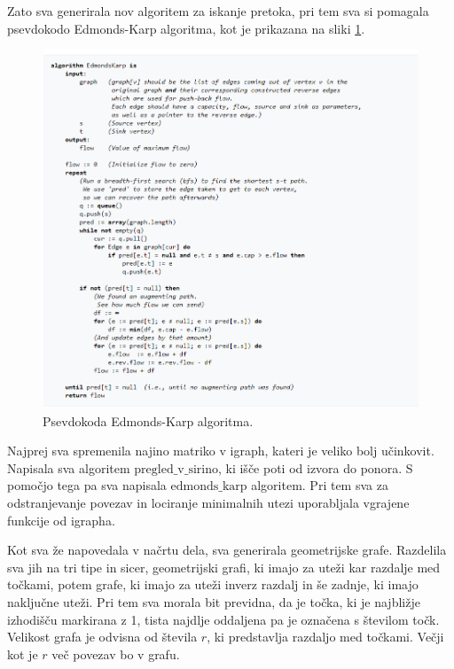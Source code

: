 \documentclass[a4paper]{article}
\begin{document}
Zato sva generirala nov algoritem za iskanje pretoka, pri tem sva si pomagala psevdokodo Edmonds-Karp algoritma, kot je prikazana na sliki \ref{fig1}. 


\begin{figure}[H]
\centerline{\includegraphics[scale=.5]{edmondkarp.PNG}}
\caption{Psevdokoda Edmonds-Karp algoritma.}
\label{fig1}
\end{figure}

Najprej sva spremenila najino matriko v igraph, kateri je veliko bolj učinkovit. Napisala sva algoritem $\text{pregled\_v\_sirino}$, ki išče poti od izvora do ponora. S pomočjo tega pa sva napisala $\text{edmonds\_karp}$ algoritem. Pri tem sva za odstranjevanje povezav in lociranje minimalnih utezi uporabljala vgrajene funkcije od igrapha. 

Kot sva že napovedala v načrtu dela, sva generirala geometrijske grafe. Razdelila sva jih na tri tipe in sicer, geometrijski grafi, ki imajo za uteži kar razdalje med točkami, potem grafe, ki imajo za uteži inverz razdalj in še zadnje, ki imajo naključne uteži.  Pri tem sva morala bit previdna, da je točka, ki je najbližje izhodišču markirana z 1, tista najdlje oddaljena pa je označena s številom točk. Velikost grafa je odvisna od števila $r$, ki predstavlja razdaljo med točkami. Večji kot je $r$ več povezav bo v grafu. 
\end{document}
